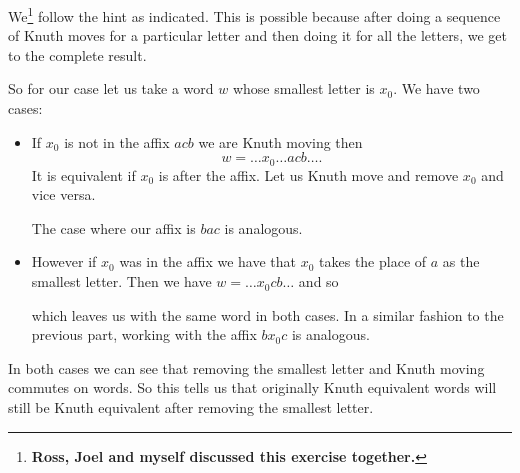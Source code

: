 \documentclass[12pt]{memoir}
\begin{document}
\begin{ptcbr}
   We\footnote{\bfseries{Ross}, \bfseries{Joel} and myself discussed this exercise together.} follow the hint as indicated. This is possible because after doing a sequence of Knuth moves for a particular letter and then doing it for all the letters, we get to the complete result.\par
   So for our case let us take a word $w$ whose smallest letter is $x_0$. We have two cases:
   \begin{itemize}
    \item If $x_0$ is not in the affix $acb$ we are Knuth moving then 
    $$w=\dots x_0\dots acb\dots.$$
    It is equivalent if $x_0$ is after the affix. Let us Knuth move and remove $x_0$ and vice versa.
    \begin{center}
    \end{center}
    The case where our affix is $bac$ is analogous.
    \item However if $x_0$ was in the affix we have that $x_0$ takes the place of $a$ as the smallest letter. Then we have $w=\dots x_0cb\dots$ and so
    \begin{center}
    \end{center}
    which leaves us with the same word in both cases. In a similar fashion to the previous part, working with the affix $bx_0c$ is analogous.
   \end{itemize}
   In both cases we can see that removing the smallest letter and Knuth moving commutes on words. So this tells us that originally Knuth equivalent words will still be Knuth equivalent after removing the smallest letter.
\end{ptcbr}
\end{document}
